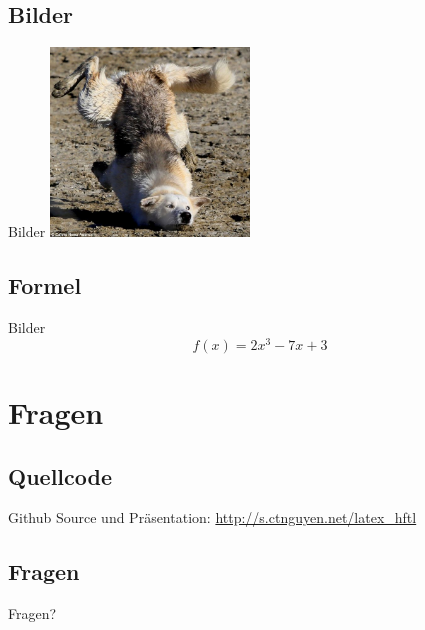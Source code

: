 \documentclass[xcolor=x11names,compress]{beamer} %
\renewcommand{\(}{\begin{columns}}
\renewcommand{\)}{\end{columns}}
\newcommand{\<}[1]{\begin{column}{#1}}
\renewcommand{\>}{\end{column}}
\begin{document}
	\subsection{Bilder}
		\begin{frame}{Bilder}
			\includegraphics[width=200px]{images/GiSapDA.jpg}
		\end{frame}

	\subsection{Formel}
		\begin{frame}{Bilder}
			$$ f(x) = 2x^3 -7x +3 $$
		\end{frame}

\section{Fragen}
	\subsection{Quellcode}
		\begin{frame}
			Github Source und Präsentation:
			\href{http://s.ctnguyen.net/latex_hftl}{http://s.ctnguyen.net/latex\_hftl}
		\end{frame}

	\subsection{Fragen}
		\begin{frame}
			\huge{Fragen?}
		\end{frame}
\end{document}

